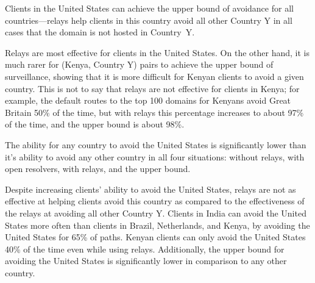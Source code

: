 \begin{finding}
Clients in the United States can achieve the upper bound of avoidance for all countries---relays help clients in this country avoid all other Country Y in all cases that the domain is not hosted in Country~Y.  
\end{finding}
\noindent
Relays are most effective for clients in the United States.  On the other hand, it is much rarer for (Kenya, Country Y) pairs to achieve the upper bound of surveillance, showing that it is more difficult for Kenyan clients to avoid a given country.  This is not to say that relays are not effective for clients in Kenya; for example, the default routes to the top 100 domains for Kenyans avoid Great Britain 50\% of the time, but with relays this percentage increases to about 97\% of the time, and the upper bound is about 98\%. 

\begin{finding}
The ability for any country to avoid the United States is significantly lower than it's ability to avoid any other country in all four situations: without relays, with open resolvers, with relays, and the upper bound. 
\end{finding}
\noindent
Despite increasing clients' ability to avoid the United States, relays are not as effective at helping clients avoid this country as compared to the effectiveness of the relays at avoiding all other Country Y.  Clients in India can avoid the United States more often than clients in Brazil, Netherlands, and Kenya, by avoiding the United States for 65\% of paths.  Kenyan clients can only avoid the United States 40\% of the time even while using relays.  Additionally, the upper bound for avoiding the United States is significantly lower in comparison to any other country.  

